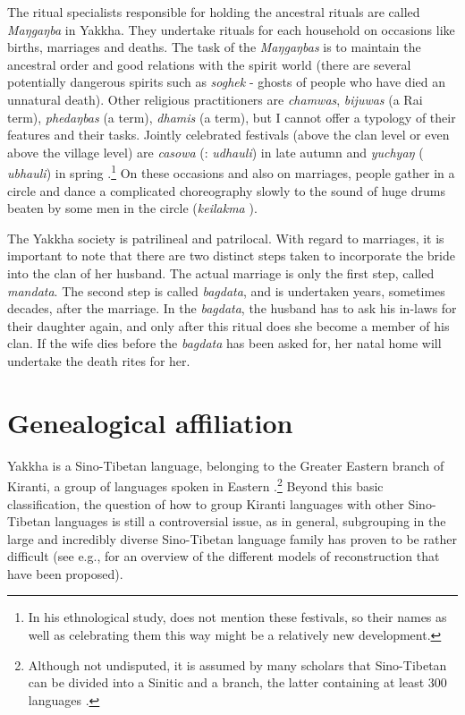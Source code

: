 The ritual specialists responsible for holding the ancestral rituals are called \emph{Maŋgaŋba} in Yakkha. They undertake rituals for each household on occasions like births, marriages and deaths. The task of the \emph{Maŋgaŋbas} is to maintain the ancestral order and good relations with the spirit world (there are several potentially dangerous spirits such as \emph{soghek} - ghosts of people who have died an unnatural death). Other religious practitioners are \emph{chamwas},  \emph{bijuwas} (a Rai term), \emph{phedaŋbas} (a  term), \emph{dhamis} (a  term), but I cannot offer a typology of their features and their tasks. Jointly celebrated festivals (above the clan level or even above the village level) are \emph{casowa} (: \emph{udhauli}) in late autumn and \emph{yuchyaŋ} ( \emph{ubhauli}) in spring \citep[102]{Kongren2007Indigenous}.\footnote{In his ethnological study, \citet{Russell1992_Yakha}  does not mention these festivals, so their names as well as  celebrating them this way might be a relatively new development.} On these occasions and also on marriages, people gather in a circle and dance a complicated choreography slowly to the sound of huge drums beaten by some men in the circle (\emph{keilakma} ).

The Yakkha society is patrilineal and patrilocal. With regard to marriages, it is important to note that there are two distinct steps taken to incorporate the bride into the clan of her husband. The actual marriage is only the first step, called \emph{mandata}. The second step is called \emph{bagdata}, and is undertaken years, sometimes decades, after the marriage. In the \emph{bagdata}, the husband has to ask his in-laws for their daughter again, and only after this ritual does she become a member of his clan. If the wife dies before the \emph{bagdata} has been asked for, her natal home will undertake the death rites for her.

 
\section{Genealogical affiliation}\label{genetic}

Yakkha is a Sino-Tibetan language, belonging to the Greater Eastern branch of Kiranti, a group of  languages spoken in Eastern .\footnote{Although not  undisputed, it is assumed by many scholars that Sino-Tibetan can be divided into a Sinitic and a  branch, the latter containing at least 300 languages \citep{Bradley1997_Tibeto-Burman, Matisoff2003Handbook}.}  Beyond this basic classification, the question of how to group Kiranti languages with other Sino-Tibetan languages is still a controversial issue, as in general, subgrouping in the large and incredibly diverse Sino-Tibetan language family has proven to be rather difficult (see e.g., \citealt[Chapter 3]{Hyslop2011_Kurtop} for an overview of the different models of reconstruction that have been proposed).

